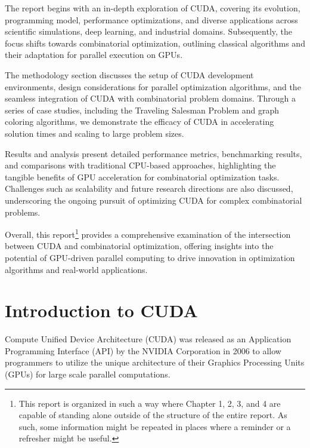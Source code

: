 \documentclass[11pt]{report}
\begin{document}
The report begins with an in-depth exploration of CUDA, covering its evolution, programming model, performance optimizations, and diverse applications across scientific simulations, deep learning, and industrial domains. Subsequently, the focus shifts towards combinatorial optimization, outlining classical algorithms and their adaptation for parallel execution on GPUs.

The methodology section discusses the setup of CUDA development environments, design considerations for parallel optimization algorithms, and the seamless integration of CUDA with combinatorial problem domains. Through a series of case studies, including the Traveling Salesman Problem and graph coloring algorithms, we demonstrate the efficacy of CUDA in accelerating solution times and scaling to large problem sizes.

Results and analysis present detailed performance metrics, benchmarking results, and comparisons with traditional CPU-based approaches, highlighting the tangible benefits of GPU acceleration for combinatorial optimization tasks. Challenges such as scalability and future research directions are also discussed, underscoring the ongoing pursuit of optimizing CUDA for complex combinatorial problems.

Overall, this report\footnote{This report is organized in such a way where Chapter 1, 2, 3, and 4 are capable of standing alone outside of the structure of the entire report. As such, some information might be repeated in places where a reminder or a refresher might be useful.} provides a comprehensive examination of the intersection between CUDA and combinatorial optimization, offering insights into the potential of GPU-driven parallel computing to drive innovation in optimization algorithms and real-world applications.




\tableofcontents
\chapter{Introduction to CUDA}
Compute Unified Device Architecture (CUDA) was released as an Application Programming Interface (API) by the NVIDIA Corporation in 2006\cite{CPP_GUIDE} to allow programmers to utilize the unique architecture of their Graphics Processing Units (GPUs) for large scale parallel computations.
\end{document}
